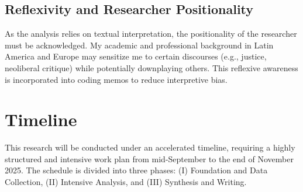 \subsection*{Reflexivity and Researcher Positionality}
As the analysis relies on textual interpretation, the positionality of the researcher 
must be acknowledged. My academic and professional background in Latin America and 
Europe may sensitize me to certain discourses (e.g., justice, neoliberal critique) 
while potentially downplaying others. This reflexive awareness is incorporated into 
coding memos to reduce interpretive bias.

\section*{Timeline}

This research will be conducted under an accelerated timeline, requiring a highly structured 
and intensive work plan from mid-September to the end of November 2025. The schedule is 
divided into three phases: 
(I) Foundation and Data Collection, 
(II) Intensive Analysis, and 
(III) Synthesis and Writing.

